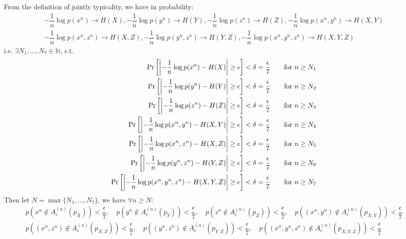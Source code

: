 From the definition of jointly typicality, we have in probability:
\begin{align*}
-\dfrac{1}{n}\log p(x^n)\to H(X), -\dfrac{1}{n}\log p(y^n) \to H(Y), -\dfrac{1}{n}\log p(z^n) \to H(Z), -\dfrac{1}{n}\log p(x^n,y^n)\to H(X,Y) \\
-\dfrac{1}{n}\log p(x^n,z^n)\to H(X,Z), -\dfrac{1}{n}\log p(y^n,z^n) \to H(Y,Z), -\dfrac{1}{n}\log p(x^n,y^n,z^n)\to H(X,Y,Z)
\end{align*}
i.e. $\exists N_1,\ldots,N_7\in\mathbb{N}$, s.t.
\begin{align*}
\Pr\left[\left|-\dfrac{1}{n}\log p(x^n)-H(X)\right| \geq \epsilon\right] &< \delta = \dfrac{\epsilon}{7} \text{\qquad for } n\geq N_1 \\
\Pr\left[\left|-\dfrac{1}{n}\log p(y^n)-H(Y)\right| \geq \epsilon\right] &< \delta = \dfrac{\epsilon}{7} \text{\qquad for } n\geq N_2 \\
\Pr\left[\left|-\dfrac{1}{n}\log p(z^n)-H(Z)\right| \geq \epsilon\right] &< \delta = \dfrac{\epsilon}{7} \text{\qquad for } n\geq N_3 \\
\Pr\left[\left|-\dfrac{1}{n}\log p(x^n,y^n)-H(X,Y)\right| \geq \epsilon\right] &< \delta = \dfrac{\epsilon}{7} \text{\qquad for } n\geq N_4 \\
\Pr\left[\left|-\dfrac{1}{n}\log p(x^n,z^n)-H(X,Z)\right| \geq \epsilon\right] &< \delta = \dfrac{\epsilon}{7} \text{\qquad for } n\geq N_5 \\
\Pr\left[\left|-\dfrac{1}{n}\log p(y^n,z^n)-H(Y,Z)\right| \geq \epsilon\right] &< \delta = \dfrac{\epsilon}{7} \text{\qquad for } n\geq N_6 \\
\Pr\left[\left|-\dfrac{1}{n}\log p(x^n,y^n,z^n)-H(X,Y,Z)\right| \geq \epsilon\right] &< \delta = \dfrac{\epsilon}{7} \text{\qquad for } n\geq N_7
\end{align*}
Then let $N=\max\{N_1,\ldots,N_7\}$, we have $\forall n\geq N$:
\begin{align*}
p\left(x^n\notin A_{\epsilon}^{(n)}(p_X)\right)<\dfrac{\epsilon}{7}, \quad p\left(y^n\notin A_{\epsilon}^{(n)}(p_Y)\right)<\dfrac{\epsilon}{7}, \quad p\left(z^n\notin A_{\epsilon}^{(n)}(p_Z)\right)<\dfrac{\epsilon}{7}, \quad p\left(\left(x^n,y^n\right)\notin A_{\epsilon}^{(n)}(p_{X,Y})\right)<\dfrac{\epsilon}{7} \\
p\left(\left(x^n,z^n\right)\notin A_{\epsilon}^{(n)}(p_{X,Z})\right)<\dfrac{\epsilon}{7}, \quad p\left(\left(y^n,z^n\right)\notin A_{\epsilon}^{(n)}(p_{Y,Z})\right)<\dfrac{\epsilon}{7}, \quad p\left(\left(x^n,y^n,z^n\right)\notin A_{\epsilon}^{(n)}(p_{X,Y,Z})\right)<\dfrac{\epsilon}{7}
\end{align*}
